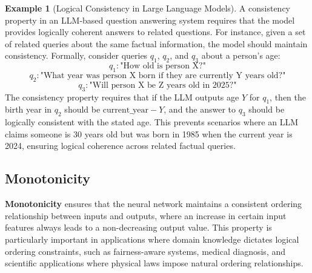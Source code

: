 \documentclass[oneside,11pt,dvipsnames]{book}
\numberwithin{equation}{section}
\theoremstyle{definition}
\newtheorem{example}{Example}[section]
\theoremstyle{remark}
\begin{document}
\begin{example}[Logical Consistency in Large Language Models]
    A consistency property in an LLM-based question answering system requires that the model provides logically coherent answers to related questions. For instance, given a set of related queries about the same factual information, the model should maintain consistency. Formally, consider queries $q_1$, $q_2$, and $q_3$ about a person's age:
\[
q_1: \text{"How old is person X?"}
\]
\[
q_2: \text{"What year was person X born if they are currently Y years old?"}
\]
\[
q_3: \text{"Will person X be Z years old in 2025?"}
\]
The consistency property requires that if the LLM outputs age $Y$ for $q_1$, then the birth year in $q_2$ should be $\text{current\_year} - Y$, and the answer to $q_3$ should be logically consistent with the stated age. This prevents scenarios where an LLM claims someone is 30 years old but was born in 1985 when the current year is 2024, ensuring logical coherence across related factual queries.
\end{example}




\subsection{Monotonicity}

\textbf{Monotonicity} ensures that the neural network maintains a consistent ordering relationship between inputs and outputs, where an increase in certain input features always leads to a non-decreasing output value. This property is particularly important in applications where domain knowledge dictates logical ordering constraints, such as fairness-aware systems, medical diagnosis, and scientific applications where physical laws impose natural ordering relationships.
\end{document}
